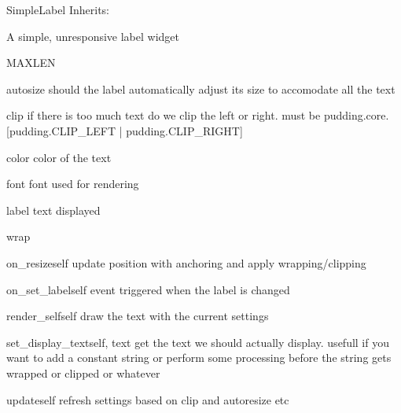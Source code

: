 \begin{classdesc*}{SimpleLabel}
Inherits:

A simple, unresponsive label widget

\begin{datadesc}{MAXLEN}
\end{datadesc}
\begin{memberdesc}{autosize}
should the label automatically adjust its size 
to accomodate all the text
\end{memberdesc}

\begin{memberdesc}{clip}
if there is too much text do we clip the left 
or right. must be pudding.core.[pudding.CLIP_LEFT | 
pudding.CLIP_RIGHT]
\end{memberdesc}

\begin{memberdesc}{color}
color of the text
\end{memberdesc}

\begin{memberdesc}{font}
font used for rendering
\end{memberdesc}

\begin{memberdesc}{label}
text displayed
\end{memberdesc}

\begin{memberdesc}{wrap}

\end{memberdesc}

\begin{methoddesc}{on_resize}{self}
update position with anchoring and apply wrapping/clipping
\end{methoddesc}

\begin{methoddesc}{on_set_label}{self}
event triggered when the label is changed
\end{methoddesc}

\begin{methoddesc}{render_self}{self}
draw the text with the current settings
\end{methoddesc}

\begin{methoddesc}{set_display_text}{self, text}
get the text we should actually display. usefull if you want to add a
constant string or perform some processing before the string gets 
wrapped or clipped or whatever
\end{methoddesc}

\begin{methoddesc}{update}{self}
refresh settings based on clip and autoresize etc
\end{methoddesc}

\end{classdesc*}


